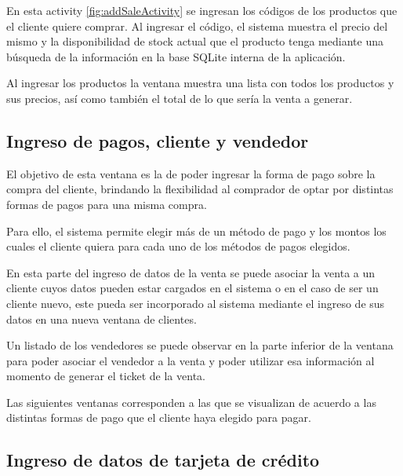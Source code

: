 En esta activity \ref{fig:addSaleActivity} se ingresan los c\'odigos de los productos que el cliente quiere comprar. Al ingresar el c\'odigo, el sistema muestra el precio del mismo y la disponibilidad de stock actual que el producto tenga mediante una b\'usqueda de la informaci\'on en la base SQLite interna de la aplicaci\'on.

Al ingresar los productos la ventana muestra una lista con todos los productos y sus precios, as\'i como tambi\'en el total de lo que ser\'ia la venta a generar.


\subsection{Ingreso de pagos, cliente y vendedor}
\label{subsec:ui.addsale.payments}

El objetivo de esta ventana es la de poder ingresar la forma de pago sobre la compra del cliente, brindando la flexibilidad al comprador de optar por distintas formas de pagos para una misma compra.

Para ello, el sistema permite elegir m\'as de un m\'etodo de pago y los montos los cuales el cliente quiera para cada uno de los m\'etodos de pagos elegidos.

En esta parte del ingreso de datos de la venta se puede asociar la venta a un cliente cuyos datos pueden estar cargados en el sistema o en el caso de ser un cliente nuevo, este pueda ser incorporado al sistema mediante el ingreso de sus datos en una nueva ventana de clientes.

Un listado de los vendedores se puede observar en la parte inferior de la ventana para poder asociar el vendedor a la venta y poder utilizar esa informaci\'on al momento de generar el ticket de la venta.

Las siguientes ventanas corresponden a las que se visualizan de acuerdo a las distintas formas de pago que el cliente haya elegido para pagar.


\subsection{Ingreso de datos de tarjeta de cr\'edito}
\label{subsec:ui.addsale.creditcard}


